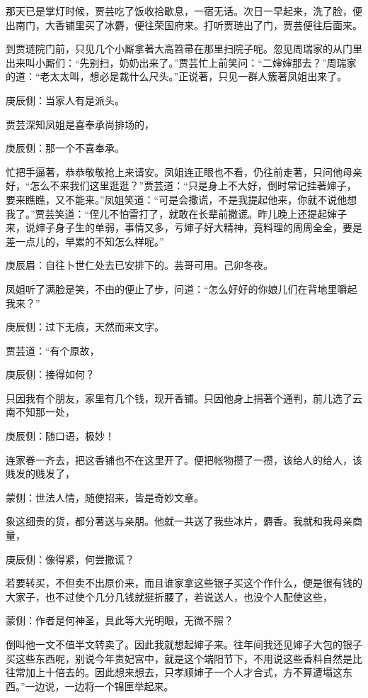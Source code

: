 \begin{parag}
    那天已是掌灯时候，贾芸吃了饭收拾歇息，一宿无话。次日一早起来，洗了脸，便出南门，大香铺里买了冰麝，便往荣国府来。打听贾琏出了门，贾芸便往后面来。
\end{parag}


\begin{parag}
    到贾琏院门前，只见几个小厮拿著大高笤帚在那里扫院子呢。忽见周瑞家的从门里出来叫小厮们：“先别扫，奶奶出来了。”贾芸忙上前笑问：“二婶婶那去？”周瑞家的道：“老太太叫，想必是裁什么尺头。”正说著，只见一群人簇著凤姐出来了。\begin{note}庚辰侧：当家人有是派头。\end{note}贾芸深知凤姐是喜奉承尚排场的，\begin{note}庚辰侧：那一个不喜奉承。\end{note}忙把手逼著，恭恭敬敬抢上来请安。凤姐连正眼也不看，仍往前走著，只问他母亲好，“怎么不来我们这里逛逛？”贾芸道：“只是身上不大好，倒时常记挂著婶子，要来瞧瞧，又不能来。”凤姐笑道：“可是会撒谎，不是我提起他来，你就不说他想我了。”贾芸笑道：“侄儿不怕雷打了，就敢在长辈前撒谎。昨儿晚上还提起婶子来，说婶子身子生的单弱，事情又多，亏婶子好大精神，竟料理的周周全全，要是差一点儿的，早累的不知怎么样呢。”\begin{note}庚辰眉：自往卜世仁处去已安排下的。芸哥可用。己卯冬夜。\end{note}
\end{parag}


\begin{parag}
    凤姐听了满脸是笑，不由的便止了步，问道：“怎么好好的你娘儿们在背地里嚼起我来？”\begin{note}庚辰侧：过下无痕，天然而来文字。\end{note}贾芸道：“有个原故，\begin{note}庚辰侧：接得如何？\end{note}只因我有个朋友，家里有几个钱，现开香铺。只因他身上捐著个通判，前儿选了云南不知那一处，\begin{note}庚辰侧：随口语，极妙！\end{note}连家眷一齐去，把这香铺也不在这里开了。便把帐物攒了一攒，该给人的给人，该贱发的贱发了，\begin{note}蒙侧：世法人情，随便招来，皆是奇妙文章。\end{note}象这细贵的货，都分著送与亲朋。他就一共送了我些冰片，麝香。我就和我母亲商量，\begin{note}庚辰侧：像得紧，何尝撒谎？\end{note}若要转买，不但卖不出原价来，而且谁家拿这些银子买这个作什么，便是很有钱的大家子，也不过使个几分几钱就挺折腰了，若说送人，也没个人配使这些，\begin{note}蒙侧：作者是何神圣，具此等大光明眼，无微不照？\end{note}倒叫他一文不值半文转卖了。因此我就想起婶子来。往年间我还见婶子大包的银子买这些东西呢，别说今年贵妃宫中，就是这个端阳节下，不用说这些香料自然是比往常加上十倍去的。因此想来想去，只孝顺婶子一个人才合式，方不算遭塌这东西。”一边说，一边将一个锦匣举起来。
\end{parag}


